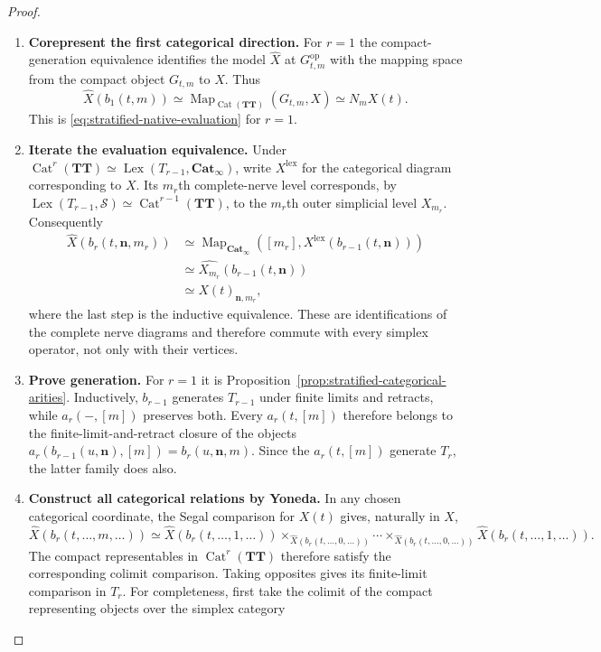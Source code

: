 \documentclass[oneside]{article}
\theoremstyle{plain}
\theoremstyle{definition}
\theoremstyle{remark}
\newcommand{\Cat}{\mathbf{Cat}_{\infty}}
\newcommand{\Lex}{\operatorname{Lex}}
\newcommand{\Map}{\operatorname{Map}}
\newcommand{\Sps}{\mathcal S}
\newcommand{\TT}{\mathbf{TT}}
\newcommand{\op}{\mathrm{op}}
\begin{document}
\begin{proof}
\leavevmode
\begin{enumerate}
\item \textbf{Corepresent the first categorical direction.}
For $r=1$ the compact-generation equivalence identifies the model
$\widehat X$ at $G_{t,m}^{\op}$ with the mapping space from the
compact object $G_{t,m}$ to $X$.  Thus
\[
 \widehat X(b_1(t,m))
 \simeq\Map_{\operatorname{Cat}(\TT)}(G_{t,m},X)
 \simeq N_mX(t).
\]
This is \eqref{eq:stratified-native-evaluation} for $r=1$.
\item \textbf{Iterate the evaluation equivalence.}
Under
$\operatorname{Cat}^r(\TT)\simeq\Lex(T_{r-1},\Cat)$,
write $X^\mathrm{lex}$ for the categorical diagram corresponding to
$X$.  Its $m_r$th complete-nerve level corresponds, by
$\Lex(T_{r-1},\Sps)\simeq\operatorname{Cat}^{r-1}(\TT)$,
to the $m_r$th outer simplicial level $X_{m_r}$.  Consequently
\begin{align*}
 \widehat X(b_r(t,\mathbf n,m_r))
 &\simeq\Map_{\Cat}([m_r],X^\mathrm{lex}(b_{r-1}(t,\mathbf n)))\\
 &\simeq\widehat{X_{m_r}}(b_{r-1}(t,\mathbf n))\\
 &\simeq X(t)_{\mathbf n,m_r},
\end{align*}
where the last step is the inductive equivalence.  These are
identifications of the complete nerve diagrams and therefore commute
with every simplex operator, not only with their vertices.
\item \textbf{Prove generation.}
For $r=1$ it is
Proposition~\ref{prop:stratified-categorical-arities}.  Inductively,
$b_{r-1}$ generates $T_{r-1}$ under finite limits and retracts,
while $a_r(-,[m])$ preserves both.  Every $a_r(t,[m])$ therefore
belongs to the finite-limit-and-retract closure of the objects
$a_r(b_{r-1}(u,\mathbf n),[m])=b_r(u,\mathbf n,m)$.
Since the $a_r(t,[m])$ generate $T_r$, the latter family does also.
\item \textbf{Construct all categorical relations by Yoneda.}
In any chosen categorical coordinate, the Segal comparison for
$X(t)$ gives, naturally in $X$,
\[
 \widehat X(b_r(t,\ldots,m,\ldots))
 \simeq
 \widehat X(b_r(t,\ldots,1,\ldots))
 \times_{\widehat X(b_r(t,\ldots,0,\ldots))}\cdots
 \times_{\widehat X(b_r(t,\ldots,0,\ldots))}
 \widehat X(b_r(t,\ldots,1,\ldots)).
\]
The compact representables in $\operatorname{Cat}^r(\TT)$ therefore
satisfy the corresponding colimit comparison.  Taking opposites gives
its finite-limit comparison in $T_r$.  For completeness, first take the
colimit of the compact representing objects over the simplex category

\end{enumerate}
\end{proof}
\end{document}
